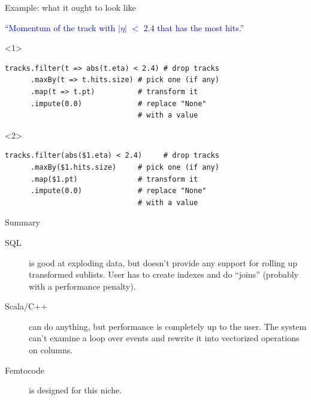\documentclass{beamer}
\begin{document}
\begin{frame}[fragile]{Example: what it ought to look like}
\vspace{0.25 cm}
\begin{center}
\begin{minipage}{0.95\linewidth}
\textcolor{darkblue}{``Momentum of the track with $|\eta|$ $<$ 2.4 that has the most hits.''}
\end{minipage}
\end{center}
\small
\begin{onlyenv}<1>
\begin{verbatim}
tracks.filter(t => abs(t.eta) < 2.4) # drop tracks
      .maxBy(t => t.hits.size) # pick one (if any)
      .map(t => t.pt)          # transform it
      .impute(0.0)             # replace "None"
                               # with a value
\end{verbatim}
\end{onlyenv}
\begin{onlyenv}<2>
\begin{verbatim}
tracks.filter(abs($1.eta) < 2.4)     # drop tracks
      .maxBy($1.hits.size)     # pick one (if any)
      .map($1.pt)              # transform it
      .impute(0.0)             # replace "None"
                               # with a value
\end{verbatim}
\end{onlyenv}
\end{frame}

\begin{frame}{Summary}
\begin{description}
\item[SQL] is good at exploding data, but doesn't provide any support for rolling up transformed sublists. User has to create indexes and do ``joins'' (probably with a performance penalty).
\item[Scala/C++] can do anything, but performance is completely up to the user. The system can't examine a loop over events and rewrite it into vectorized operations on columns.
\item[Femtocode] is designed for this niche.
\end{description}
\end{frame}
\end{document}
